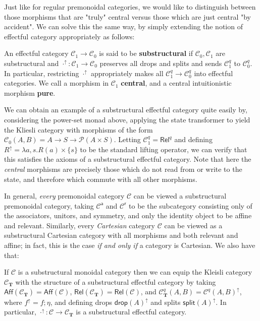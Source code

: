 \documentclass[acmsmall,screen,review]{acmart}
\newcommand{\mc}[1]{\ensuremath{\mathcal{#1}}}
\newcommand{\mb}[1]{\ensuremath{\mathbf{#1}}}
\newcommand{\ms}[1]{\ensuremath{\mathsf{#1}}}
\newcommand{\upg}[2]{{#1}^{\uparrow #2}}
\begin{document}
Just like for regular premonoidal categories, we would like to distinguish
between those morphisms that are "truly" central versus those which are just
central "by accident". We can solve this the same way, by simply extending the
notion of effectful category appropriately as follows:
\begin{definition}
  An effectful category \(\mc{C}_1 \to \mc{C}_0\) is said to be
  \textbf{substructural} if \(\mc{C}_0, \mc{C}_1\) are substructural and
  \(\upg{\cdot}{}: \mc{C}_1 \to \mc{C}_0\) preserves all drops and splits and
  sends \(\mc{C}_1^q\) to \(\mc{C}_0^q\). In particular, restricting
  \(\upg{\cdot}{}\) appropriately makes all \(\mc{C}_1^q \to \mc{C}_0^q\) into
  effectful categories.  We call a morphism in \(\mc{C}_1\) \textbf{central},
  and a central intuitionistic morphism \textbf{pure}.
\end{definition}
We can obtain an example of a substructural effectful category quite easily by,
considering the power-set monad above, applying the state transformer to yield
the Kliesli category with morphisms of the form \(\mc{C}_0(A, B) = A \to S \to
\mc{P}(A \times S)\). Letting \(\mc{C}_1^q = \ms{Rel}^q\) and defining
\(\upg{R}{} = \lambda a, s. R(a) \times \{s\}\) to be the standard lifting
operator, we can verify that this satisfies the axioms of a substructural
effectful category. Note that here the \textit{central} morphisms are precisely
those which do not read from or write to the state, and therefore which commute
with all other morphisms.

In general, \textit{every} premonoidal category \(\mc{C}\) can be viewed a
substructural premonoidal category, taking \(\mc{C}^{\ms{a}}\) and
\(\mc{C}^{\ms{r}}\) to be the subcategory consisting only of the associators,
unitors, and symmetry, and only the identity object to be affine and relevant.
Similarly, every \textit{Cartesian} category \(\mc{C}\) can be viewed as a
substructural Cartesian category with all morphisms and both relevant and
affine; in fact, this is the case \textit{if and only if} a category is
Cartesian. We also have that:
\begin{proposition}
  If \(\mc{C}\) is a substructural monoidal category then we can equip the
  Kleisli category \(\mc{C}_{\mb{T}}\) with the structure of a substructural
  effectful category by taking \(\ms{Aff}(\mc{C}_{\mb{T}}) = \ms{Aff}(\mc{C})\),
  \(\ms{Rel}(\mc{C}_{\mb{T}}) = \ms{Rel}(\mc{C})\), and \(\mc{C}_{\mb{T}}^q(A,
  B) = \upg{\mc{C}^q(A, B)}{}\), where \(\upg{f}{} = f;\eta\), and defining
  drops \(\upg{\ms{drop}(A)}{}\) and splits \(\upg{\ms{split}(A)}{}\). In
  particular, \(\upg{\cdot}{}: \mc{C} \to \mc{C}_{\mb{T}}\) is a substructural
  effectful category.
\end{proposition}
\end{document}
